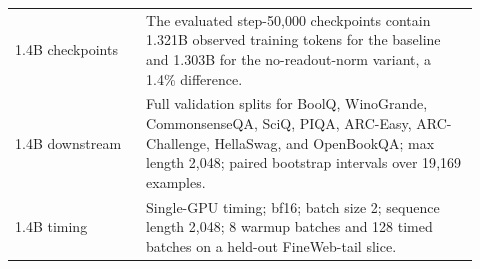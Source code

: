 \begin{table}[!htbp]
\begin{tabular}{p{0.26\linewidth}p{0.66\linewidth}}
1.4B checkpoints & The evaluated step-50{,}000 checkpoints contain 1.321B observed training tokens for the baseline and 1.303B for the no-readout-norm variant, a 1.4\% difference. \\
1.4B downstream & Full validation splits for BoolQ, WinoGrande, CommonsenseQA, SciQ, PIQA, ARC-Easy, ARC-Challenge, HellaSwag, and OpenBookQA; max length 2{,}048; paired bootstrap intervals over 19{,}169 examples. \\
1.4B timing & Single-GPU timing; bf16; batch size 2; sequence length 2{,}048; 8 warmup batches and 128 timed batches on a held-out FineWeb-tail slice. \\
\bottomrule
\end{tabular}
\end{table}

\FloatBarrier
